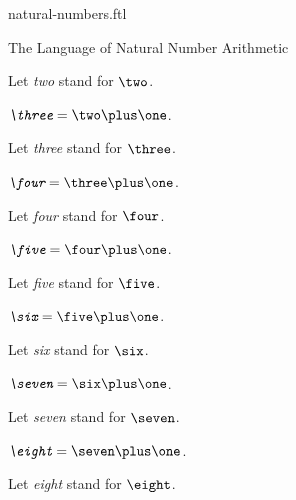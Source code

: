 \documentclass{naproche-library}
\begin{document}
\begin{smodule}[title=Natural Numbers]{natural-numbers.ftl}
\begin{sfragment}{The Language of Natural Number Arithmetic}
\begin{definition}[forthel,id=TwoSig]
    Let \emph{two} stand for $\two$.
  \end{definition}


  \begin{definition}[forthel,id=ThreeSig]
    $\emph{\three}=\two\plus\one$.

    Let \emph{three} stand for $\three$.
  \end{definition}


  \begin{definition}[forthel,id=FourSig]
    $\emph{\four}=\three\plus\one$.

    Let \emph{four} stand for $\four$.
  \end{definition}


  \begin{definition}[forthel,id=FiveSig]
    $\emph{\five}=\four\plus\one$.

    Let \emph{five} stand for $\five$.
  \end{definition}


  \begin{definition}[forthel,id=SixSig]
    $\emph{\six}=\five\plus\one$.

    Let \emph{six} stand for $\six$.
  \end{definition}


  \begin{definition}[forthel,id=SevenSig]
    $\emph{\seven}=\six\plus\one$.

    Let \emph{seven} stand for $\seven$.
  \end{definition}


  \begin{definition}[forthel,id=EightSig]
    $\emph{\eight}=\seven\plus\one$.

    Let \emph{eight} stand for $\eight$.
  \end{definition}



\end{sfragment}
\end{smodule}
\end{document}
